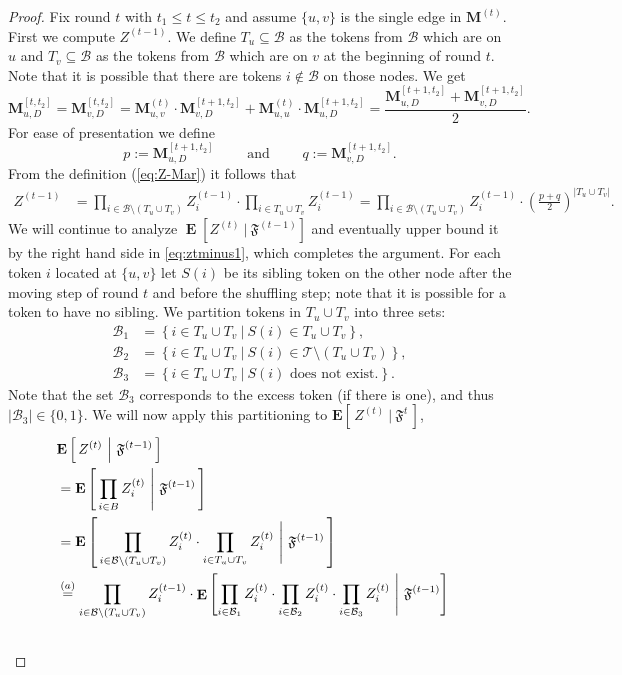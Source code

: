 \documentclass[twoside,leqno]{article}
\DeclareMathOperator{\E}{\mathbf{E}}
\newcommand{\Ex}[1]{\mathbf{E} \left[\,#1\,\right]}
\newcommand{\Exco}[2]{\mathbf{E} \left[\,#1~\middle\vert~#2\,\right]}
\newcommand{\M}{\mathbf{M}}
\newcommand{\B}{\mathcal{B}}
\DeclareMathOperator{\1}{\mathbf{1}}
\numberwithin{equation}{section}
\begin{document}
\begin{proof}
Fix round $t$ with $t_1\le t\le t_2$ and assume $\{u,v\}$ is the single edge in $\M^{(t)}$.
First we compute $Z^{(t-1)}$.
We define $T_u \subseteq \B$ as the tokens from $\B$ which are on $u$ and $T_v \subseteq \B$ as the tokens from $\B$ which are on $v$ at the beginning of round $t$.
Note that it is possible that there are tokens $i \not\in \B$ on those nodes.
We get
\[ \M_{u,D}^{[t,t_2]}=\M_{v,D}^{[t,t_2]}=
\M_{u,v}^{(t)} \cdot \M_{v,D}^{[t+1,t_2]} + \M_{u,u}^{(t)} \cdot \M_{u,D}^{[t+1,t_2]} =
\frac{\M_{u,D}^{[t+1,t_2]}+\M_{v,D}^{[t+1,t_2]}}{2}. \]
For ease of presentation we define
\[
p:=\M_{u,D}^{[t+1,t_2]} \qquad \mbox{ and } \qquad q:=\M_{v,D}^{[t+1,t_2]}
.
\]
From the definition (\ref{eq:Z-Mar}) it follows that
\begin{align}
Z^{(t-1)} &=
\prod_{i \in \B \setminus ( T_u \cup T_v ) } Z_i^{(t-1)} \cdot \prod_{i \in T_u \cup T_v} Z_i^{(t-1)} 
=\prod_{i\in \B \setminus (T_u \cup T_v)}Z_i^{(t-1)} \cdot \left(\frac{p+q}{2}\right)^{|T_u \cup T_v|}. \label{eq:ztminus1}
\end{align}
We will continue to analyze $\E[Z^{(t)}~|~ \mathfrak{F}^{(t-1)}] $ and eventually upper bound it by the right hand side in \cref{eq:ztminus1}, which completes the argument.
For each token $i$ located at $\{u,v\}$ let $S(i)$ be its sibling token on the other node after the moving step of round $t$ and before the shuffling step; note that it is possible for a token to have no sibling.
We partition tokens in $T_u \cup T_v$ into three sets:
\begin{align*}
\B_{1} &= \left\{ i\in T_u \cup T_v ~|~  S(i) \in T_u\cup T_v \right\}, \\
\B_{2} &= \left\{i\in T_u \cup T_v ~|~ S(i) \in \mathcal{T} \setminus (T_u\cup T_v) \right\}, \\
\B_{3} &= \left\{ i\in T_u \cup T_v ~|~  \mbox{$S(i)$ does not exist.} \right\}.
\end{align*}
Note that the set $\B_{3}$ corresponds to the excess token (if there is one), and thus $|\B_{3}| \in \{0,1\}$. We will now apply this partitioning to $\Ex{ Z^{(t)} ~\Big|~ \mathfrak{F}^{t}}$,
\begin{align}
\lefteqn{\Exco{Z^{(t)}}{\mathfrak{F}^{(t-1)}} } \notag 
\\
&= \Exco{ \prod_{i \in B} Z_i^{(t)} }{\mathfrak{F}^{(t-1)}}
 \notag \\ 
&= \Ex{\prod_{i\in \B \setminus (T_u \cup T_v)}Z_i^{(t)}\cdot \prod_{i\in T_u \cup T_v} Z_i^{(t)}~\Bigg|~\mathfrak{F}^{(t-1)} }  \notag \\
& \overset{(a)}{=} \prod_{i\in \B \setminus (T_u \cup T_v)}Z_i^{(t-1)}\cdot \E\left[\prod_{i\in \B_{1}} Z_i^{(t)}\cdot \prod_{i\in \B_{2}} Z_i^{(t)}\cdot \prod_{i \in \B_{3}} Z_i^{(t)}~\Bigg|~\mathfrak{F}^{(t-1)}\right]  \notag \\&

\end{align}
\end{proof}
\end{document}

